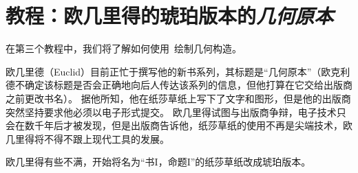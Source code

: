 %
%
%


\section{教程：欧几里得的琥珀版本的\emph{几何原本}}


在第三个教程中，我们将了解如何使用\tikzname\ 绘制几何构造。


欧几里德（Euclid）目前正忙于撰写他的新书系列，其标题是``几何原本''（欧克利德不确定该标题是否会正确地向后人传达该系列的信息，但他打算在它交给出版商之前更改书名）。 据他所知，他在纸莎草纸上写下了文字和图形，但是他的出版商突然坚持要求他必须以电子形式提交。 欧几里得试图与出版商争辩，电子技术只会在数千年后才被发现，但是出版商告诉他，纸莎草纸的使用不再是尖端技术，欧几里得将不得不跟上现代工具的发展。


欧几里得有些不满，开始将名为``书I，命题I''的纸莎草纸改成琥珀版本。


